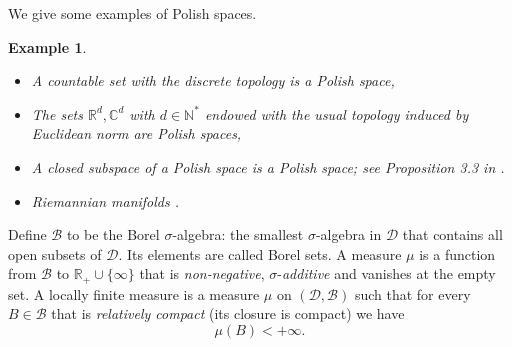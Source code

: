 \documentclass[twoside,11pt]{book}
\newtheorem{example}{Example}
\numberwithin{theorem}{chapter}
\numberwithin{definition}{chapter}
\numberwithin{proposition}{chapter}
\numberwithin{corollary}{chapter}
\numberwithin{example}{chapter}
\numberwithin{lemma}{chapter}
\numberwithin{assumption}{chapter}
\numberwithin{equation}{chapter}
\numberwithin{figure}{chapter}
\begin{document}
We give some examples of Polish spaces. 
\begin{example}\leavevmode\newline
\begin{itemize}
\item A countable set with the discrete topology is a Polish space, 
\item The sets $\mathbb{R}^{d}, \mathbb{C}^{d}$ with $d \in \mathbb{N}^{*}$ endowed with the usual topology induced by Euclidean norm are Polish spaces,
\item A closed subspace of a Polish space is a Polish space; see Proposition 3.3 in \citep{Kec95}.
\item Riemannian manifolds .

\end{itemize}
\end{example}

Define $\mathcal{B}$ to be the Borel $\sigma$-algebra: the smallest $\sigma$-algebra in $\mathcal{D}$ that contains all open subsets of $\mathcal{D}$. Its elements are called Borel sets. A measure $\mu$ is a function from $\mathcal{B}$ to $\mathbb{R}_{+} \cup \{\infty \}$ that is \emph{non-negative}, $\sigma$-\emph{additive} and vanishes at the empty set. A locally finite measure is a measure $\mu$ on $(\mathcal{D},\mathcal{B})$ such that for every  $B \in \mathcal{B}$ that is \emph{relatively compact} (its closure is compact) we have
\begin{equation}
\mu(B) <+\infty.
\end{equation}
\end{document}
